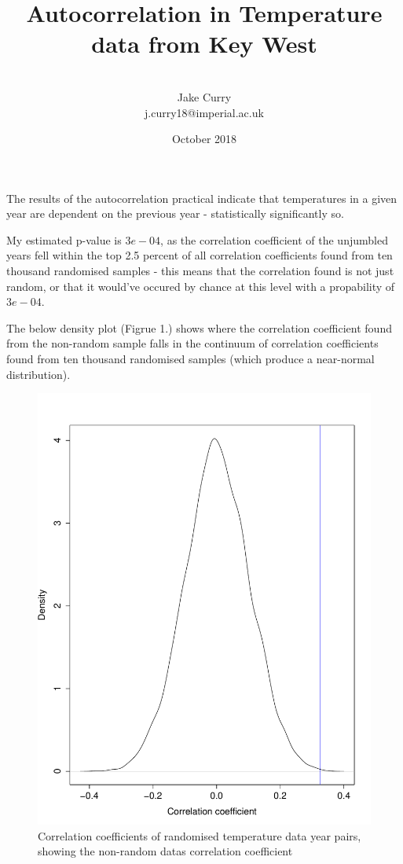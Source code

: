 \documentclass[12pt, letterpaper]{article}
\begin{document}
\title{Autocorrelation in Temperature data from Key West}
\author{\\Jake Curry\\j.curry18@imperial.ac.uk}
\date{October 2018}

\begin{titlepage}
\maketitle
\end{titlepage}

The results of the autocorrelation practical indicate that temperatures in a given year are dependent on the previous year - statistically significantly so. 

My estimated p-value is $3e-04$, as the correlation coefficient of the unjumbled years fell within the top 2.5 percent of all correlation coefficients found from ten thousand randomised samples - this means that the correlation found is not just random, or that it would've occured by chance at this level with a propability of $3e-04$. 

The below density plot (Figrue 1.) shows where the correlation coefficient found from the non-random sample falls in the continuum of correlation coefficients found from ten thousand randomised samples (which produce a near-normal distribution). 

\begin{figure}[h]
\caption{Correlation coefficients of randomised temperature data year pairs, showing the non-random datas correlation coefficient}
\centering
\includegraphics[width=12cm]{AutoCorrPlot}
\end{figure}
\end{document}
